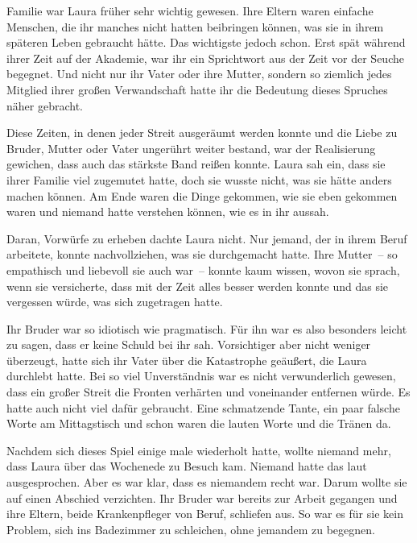 Familie war Laura früher sehr wichtig gewesen. Ihre Eltern waren einfache Menschen, die ihr manches nicht hatten beibringen können, was sie in ihrem späteren Leben gebraucht hätte. Das wichtigste jedoch schon. Erst spät während ihrer Zeit auf der Akademie, war ihr ein Sprichtwort aus der Zeit vor der Seuche begegnet.  Und nicht nur ihr Vater oder ihre Mutter, sondern so ziemlich jedes Mitglied ihrer großen Verwandschaft hatte ihr die Bedeutung dieses Spruches näher gebracht.

\par

Diese Zeiten, in denen jeder Streit ausgeräumt werden konnte und die Liebe zu Bruder, Mutter oder Vater ungerührt weiter bestand, war der Realisierung gewichen, dass auch das stärkste Band reißen konnte. Laura sah ein, dass sie ihrer Familie viel zugemutet hatte, doch sie wusste nicht, was sie hätte anders machen können. Am Ende waren die Dinge gekommen, wie sie eben gekommen waren und niemand hatte verstehen können, wie es in ihr aussah.

\par

Daran, Vorwürfe zu erheben dachte Laura nicht. Nur jemand, der in ihrem Beruf arbeitete, konnte nachvollziehen, was sie durchgemacht hatte. Ihre Mutter~-- so empathisch und liebevoll sie auch war~-- konnte kaum wissen, wovon sie sprach, wenn sie versicherte, dass mit der Zeit alles besser werden konnte und das sie vergessen würde, was sich zugetragen hatte.

\par

Ihr Bruder war so idiotisch wie pragmatisch. Für ihn war es also besonders leicht zu sagen, dass er keine Schuld bei ihr sah. Vorsichtiger aber nicht weniger überzeugt, hatte sich ihr Vater über die Katastrophe geäußert, die Laura durchlebt hatte. Bei so viel Unverständnis war es nicht verwunderlich gewesen, dass ein großer Streit die Fronten verhärten und voneinander entfernen würde. Es hatte auch nicht viel dafür gebraucht. Eine schmatzende Tante, ein paar falsche Worte am Mittagstisch und schon waren die lauten Worte und die Tränen da.

\par

Nachdem sich dieses Spiel einige male wiederholt hatte, wollte niemand mehr, dass Laura über das Wochenede zu Besuch kam. Niemand hatte das laut ausgesprochen. Aber es war klar, dass es niemandem recht war. Darum wollte sie auf einen Abschied verzichten. Ihr Bruder war bereits zur Arbeit gegangen und ihre Eltern, beide Krankenpfleger von Beruf, schliefen aus. So war es für sie kein Problem, sich ins Badezimmer zu schleichen, ohne jemandem zu begegnen.

